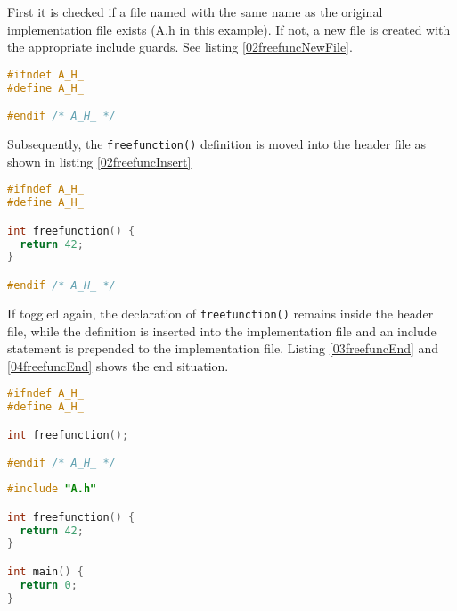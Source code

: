 First it is checked if a file named with the same name as the original
implementation file exists (A.h in this example). If not, a new file is created with the
appropriate include guards. See listing \nolinebreak\ref{02freefuncNewFile}.

\begin{lstlisting}[caption={Newly created A.h}, label={02freefuncNewFile},
language=C++]
#ifndef A_H_
#define A_H_

#endif /* A_H_ */
\end{lstlisting}

Subsequently, the \texttt{freefunction()} definition is moved into the header
file as shown in listing \nolinebreak\ref{02freefuncInsert}

\begin{lstlisting}[caption={Inserted \texttt{freefunction()} in A.h},
label={02freefuncInsert}, language=C++]
#ifndef A_H_
#define A_H_

int freefunction() {
  return 42;
}

#endif /* A_H_ */
\end{lstlisting}

If toggled again, the declaration of \texttt{freefunction()} remains inside the
header file, while the definition is inserted into the implementation file and an
include statement is prepended to the implementation file. Listing
\nolinebreak\ref{03freefuncEnd} and \ref{04freefuncEnd} shows the end
situation.

\vspace{0.5cm}
\begin{minipage}{.48\textwidth}
\lstset{xrightmargin=0.5cm}
\begin{lstlisting}[caption={Inserted freefunction in A.h},
label={03freefuncEnd}, language=C++]
#ifndef A_H_
#define A_H_

int freefunction();

#endif /* A_H_ */
\end{lstlisting}
\end{minipage}%
\begin{minipage}{.48\textwidth}
\lstset{xleftmargin=0.5cm}
\begin{lstlisting}[caption={A.cpp},label={04freefuncEnd},language=C++]
#include "A.h"

int freefunction() {
  return 42;
}

int main() {
  return 0;
}
\end{lstlisting}
\end{minipage}

